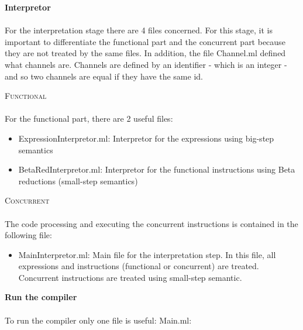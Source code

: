 \documentclass[11pt]{report}
\begin{document}
{} 
\tabto{0cm} {\LARGE \textbf{Interpretor}}
\\ \\
For the interpretation stage there are 4 files concerned. For this stage, it is important to differentiate the functional part and the concurrent part because they are not treated by the same files. In addition, the file Channel.ml defined what channels are. Channels are defined by an identifier - which is an integer - and so two channels are equal if they have the same id.
\vspace*{10pt}
{}
\tabto{1cm} {\Large \textsc{Functional}} \\ \\
For the functional part, there are 2 useful files:
\begin{itemize}
\item ExpressionInterpretor.ml: Interpretor for the expressions using big-step semantics
\item BetaRedInterpretor.ml: Interpretor for the functional instructions using Beta reductions (small-step semantics)
\end{itemize}

{} 
\tabto{1cm} {\Large \textsc{Concurrent}}
\\ \\
The code processing and executing the concurrent instructions is contained in the following file:
\begin{itemize}
\item MainInterpretor.ml: Main file for the interpretation step. In this file, all expressions and instructions (functional or concurrent) are treated. Concurrent instructions are treated using small-step semantic.
\end{itemize}


{}
\tabto{0cm} {\LARGE \textbf{Run the compiler}}
\\ \\
To run the compiler only one file is useful: Main.ml: \\ 
\end{document}

